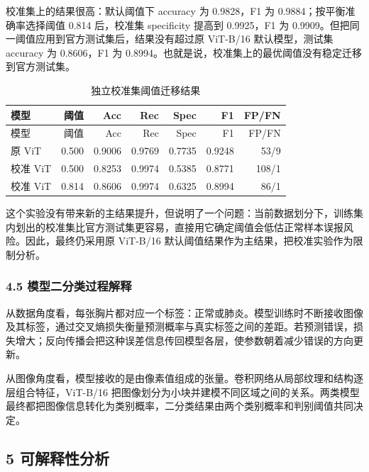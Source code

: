 \documentclass[
]{ctexart}
\begin{document}
校准集上的结果很高：默认阈值下 accuracy 为 0.9828，F1 为
0.9884；按平衡准确率选择阈值 0.814 后，校准集 specificity 提高到
0.9925，F1 为 0.9909。但把同一阈值应用到官方测试集后，结果没有超过原
ViT-B/16 默认模型，测试集 accuracy 为 0.8606，F1 为
0.8994。也就是说，校准集上的最优阈值没有稳定迁移到官方测试集。

\begin{longtable}[]{@{}lrrrrrr@{}}
\caption{独立校准集阈值迁移结果}\tabularnewline
\toprule\noalign{}
模型 & 阈值 & Acc & Rec & Spec & F1 & FP/FN \\
\midrule\noalign{}
\endfirsthead
\toprule\noalign{}
模型 & 阈值 & Acc & Rec & Spec & F1 & FP/FN \\
\midrule\noalign{}
\endhead
\bottomrule\noalign{}
\endlastfoot
原 ViT & 0.500 & 0.9006 & 0.9769 & 0.7735 & 0.9248 & 53/9 \\
校准 ViT & 0.500 & 0.8253 & 0.9974 & 0.5385 & 0.8771 & 108/1 \\
校准 ViT & 0.814 & 0.8606 & 0.9974 & 0.6325 & 0.8994 & 86/1 \\
\end{longtable}

这个实验没有带来新的主结果提升，但说明了一个问题：当前数据划分下，训练集内划出的校准集比官方测试集更容易，直接用它确定阈值会低估正常样本误报风险。因此，最终仍采用原
ViT-B/16 默认阈值结果作为主结果，把校准实验作为限制分析。

\hypertarget{ux6a21ux578bux4e8cux5206ux7c7bux8fc7ux7a0bux89e3ux91ca}{%
\subsubsection{4.5
模型二分类过程解释}\label{ux6a21ux578bux4e8cux5206ux7c7bux8fc7ux7a0bux89e3ux91ca}}

从数据角度看，每张胸片都对应一个标签：正常或肺炎。模型训练时不断接收图像及其标签，通过交叉熵损失衡量预测概率与真实标签之间的差距。若预测错误，损失增大；反向传播会把这种误差信息传回模型各层，使参数朝着减少错误的方向更新。

从图像角度看，模型接收的是由像素值组成的张量。卷积网络从局部纹理和结构逐层组合特征，ViT-B/16
把图像划分为小块并建模不同区域之间的关系。两类模型最终都把图像信息转化为类别概率，二分类结果由两个类别概率和判别阈值共同决定。

\hypertarget{ux53efux89e3ux91caux6027ux5206ux6790}{%
\subsection{5 可解释性分析}\label{ux53efux89e3ux91caux6027ux5206ux6790}}
\end{document}
